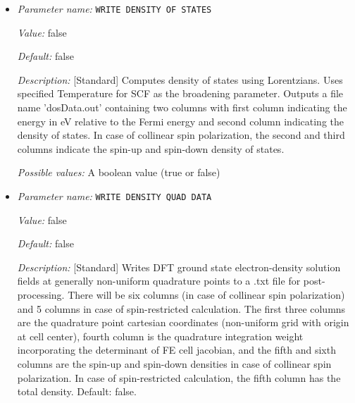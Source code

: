 \begin{itemize}
{\it Default:} false


{\it Description:} [Standard] Writes DFT ground state electron-density solution fields (FEM mesh nodal values) to densityOutput.vtu file for visualization purposes. The electron-density solution field in densityOutput.vtu is named density. In case of spin-polarized calculation, two additional solution fields- density_0 and density_1 are also written where 0 and 1 denote the spin indices. In the case of geometry optimization, the electron-density corresponding to the last ground-state solve is written. Default: false.


{\it Possible values:} A boolean value (true or false)
\item {\it Parameter name:} {\tt WRITE DENSITY OF STATES}
\label{parameters:Post_2dprocessing Options/WRITE DENSITY OF STATES}
\label{parameters:Post_2dprocessing_20Options/WRITE_20DENSITY_20OF_20STATES}


{\it Value:} false


{\it Default:} false


{\it Description:} [Standard] Computes density of states using Lorentzians. Uses specified Temperature for SCF as the broadening parameter. Outputs a file name 'dosData.out' containing two columns with first column indicating the energy in eV relative to the Fermi energy and second column indicating the density of states. In case of collinear spin polarization, the second and third columns indicate the spin-up and spin-down density of states.


{\it Possible values:} A boolean value (true or false)
\item {\it Parameter name:} {\tt WRITE DENSITY QUAD DATA}
\label{parameters:Post_2dprocessing Options/WRITE DENSITY QUAD DATA}
\label{parameters:Post_2dprocessing_20Options/WRITE_20DENSITY_20QUAD_20DATA}


{\it Value:} false


{\it Default:} false


{\it Description:} [Standard] Writes DFT ground state electron-density solution fields at generally non-uniform quadrature points to a .txt file for post-processing. There will be six columns (in case of collinear spin polarization) and 5 columns in case of spin-restricted calculation. The first three columns are the quadrature point cartesian coordinates (non-uniform grid with origin at cell center), fourth column is the quadrature integration weight incorporating the determinant of FE cell jacobian, and the fifth and sixth columns are the spin-up and spin-down densities in case of collinear spin polarization. In case of spin-restricted calculation, the fifth column has the total density. Default: false.



\end{itemize}
